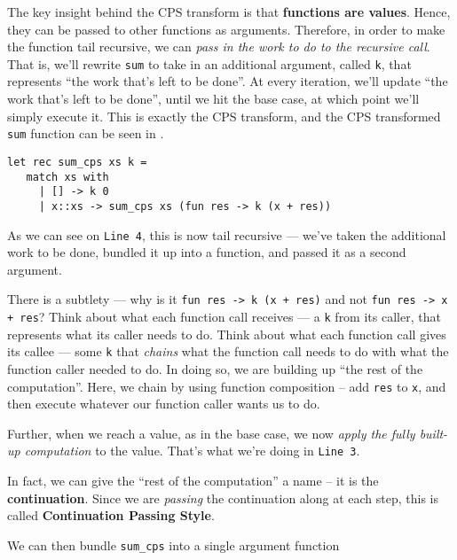 The key insight behind the CPS transform is that \textbf{functions are values}. Hence, they can be passed to other functions as arguments. Therefore, in order to make the function tail recursive, we can \emph{pass in the work to do to the recursive call}. That is, we'll rewrite \texttt{sum} to take in an additional argument, called \texttt{k}, that represents ``the work that's left to be done''. At every iteration, we'll update ``the work that's left to be done'', until we hit the base case, at which point we'll simply execute it. This is exactly the CPS transform, and the CPS transformed \texttt{sum} function can be seen in .

\begin{code}
\label{code:sum-cps-ocaml}
\begin{verbatim}
let rec sum_cps xs k = 
   match xs with
     | [] -> k 0
     | x::xs -> sum_cps xs (fun res -> k (x + res))
\end{verbatim}
\end{code}

As we can see on \texttt{Line 4}, this is now tail recursive --- we've taken the additional work to be done, bundled it up into a function, and passed it as a second argument. 

There is a subtlety --- why is it \texttt{fun res -> k (x + res)} and not \texttt{fun res -> x + res}? Think about what each function call receives --- a \texttt{k} from its caller, that represents what its caller needs to do. Think about what each function call gives its callee --- some \texttt{k} that \emph{chains} what the function call needs to do with what the function caller needed to do. In doing so, we are building up ``the rest of the computation''. Here, we chain by using function composition -- add \texttt{res} to \texttt{x}, and then execute whatever our function caller wants us to do.

Further, when we reach a value, as in the base case, we now \emph{apply the fully built-up computation} to the value. That's what we're doing in \texttt{Line 3}.

In fact, we can give the ``rest of the computation'' a name -- it is the \textbf{continuation}. Since we are \emph{passing} the continuation along at each step, this is called \textbf{Continuation Passing Style}.

We can then bundle \texttt{sum\_cps} into a single argument function

